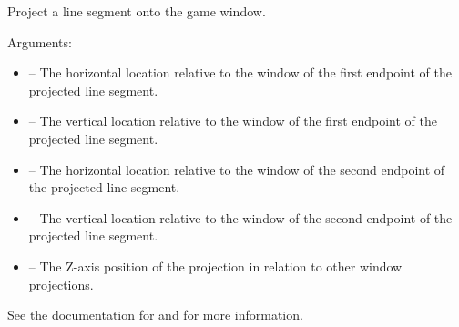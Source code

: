 \documentclass[letterpaper,10pt,english]{sphinxmanual}
\begin{document}

\begin{fulllineitems}
\label{dsp:sge.dsp.Game.project_line}
Project a line segment onto the game window.

Arguments:
\begin{itemize}
\item {} 
 -- The horizontal location relative to the window of
the first endpoint of the projected line segment.

\item {} 
 -- The vertical location relative to the window of the
first endpoint of the projected line segment.

\item {} 
 -- The horizontal location relative to the window of
the second endpoint of the projected line segment.

\item {} 
 -- The vertical location relative to the window of the
second endpoint of the projected line segment.

\item {} 
 -- The Z-axis position of the projection in relation to
other window projections.

\end{itemize}

See the documentation for {\hyperref[gfx:sge.gfx.Sprite.draw_line]{\emph{}}} and
{\hyperref[dsp:sge.dsp.Game.project_dot]{\emph{}}} for more information.

\end{fulllineitems}

\end{document}
